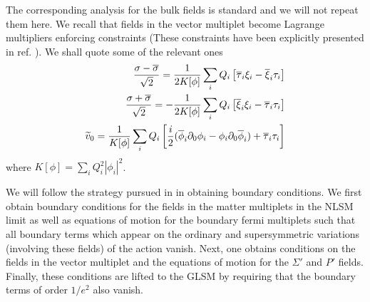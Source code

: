 \documentclass[a4paper,12pt]{article}
\begin{document}
The corresponding analysis for the bulk fields is standard and
we will not repeat them here\cite{wittenphases}.
We recall that fields in the vector multiplet
become Lagrange multipliers enforcing
constraints (These constraints have been explicitly presented in
ref. \cite{lsmone}). We shall quote some of the relevant ones
\begin{eqnarray}
{{\sigma - \overline{\sigma}}\over{\sqrt2}} =
{1\over{2K[\phi]}} \sum_i Q_i\left[ \overline{\tau}_i \xi_i -
\overline{\xi}_i \tau_i \right] \\
{{\sigma + \overline{\sigma}}\over{\sqrt2}} = -
{1\over{2K[\phi]}} \sum_i Q_i\left[ \overline{\xi}_i \xi_i -
\overline{\tau}_i \tau_i \right] \\
\widetilde{v}_0 = {1\over{K[\phi]}} \sum_i Q_i\left[ {i\over2}
(\overline{\phi}_i\partial_0 \phi_i -\phi_i \partial_0
\overline{\phi}_i) + \overline{\tau}_i \tau_i \right] \label{stgaugefield}
\end{eqnarray}
where $K[\phi]=\sum_i Q_i^2 |\phi_i|^2$.


We will follow the strategy pursued in \cite{lsmone} in obtaining
boundary conditions. We  first
obtain boundary conditions for the fields in the matter multiplets in
the NLSM limit as well as equations of motion for the boundary fermi
multiplets such that all boundary terms which appear on the ordinary and
supersymmetric variations (involving these fields) of the action vanish. 
Next, one obtains conditions on the fields in the vector
multiplet and the equations of motion for the $\Sigma'$ and $P'$ fields. 
Finally, these conditions are lifted to the GLSM by
requiring that the boundary terms of order $1/e^2$ also vanish.
\end{document}
